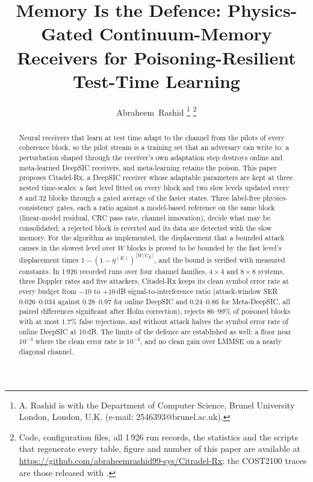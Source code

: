 \documentclass[journal]{IEEEtran}
\begin{document}
\title{Memory Is the Defence: Physics-Gated Continuum-Memory Receivers for Poisoning-Resilient Test-Time Learning}

\author{Abraheem~Rashid%
\thanks{A. Rashid is with the Department of Computer Science, Brunel University London, London, U.K. (e-mail: 2546393@brunel.ac.uk).}%
\thanks{Code, configuration files, all 1\,926 run records, the statistics and the scripts that regenerate every table, figure and number of this paper are available at \url{https://github.com/abraheemrashid99-sys/Citradel-Rx}; the COST2100 traces are those released with \cite{raviv2023}.}}

\maketitle

\begin{abstract}
Neural receivers that learn at test time adapt to the channel from the pilots of every
coherence block, so the pilot stream is a training set that an adversary can write to: a
perturbation shaped through the receiver's own adaptation step destroys online and
meta-learned DeepSIC receivers, and meta-learning retains the poison. This paper proposes
Citadel-Rx, a DeepSIC receiver whose adaptable parameters are kept at three nested
time-scales: a fast level fitted on every block and two slow levels updated every 8 and
32 blocks through a gated average of the faster states. Three label-free
physics-consistency gates, each a ratio against a model-based reference on the same
block (linear-model residual, CRC pass rate, channel innovation), decide what may be
consolidated; a rejected block is reverted and its data are detected with the slow
memory. For the algorithm as implemented, the displacement that a bounded attack causes
in the slowest level over $W$ blocks is proved to be bounded by the fast level's
displacement times $1-(1-\eta^{(K)})^{\lceil W/C_K\rceil}$, and the bound is verified with
measured constants. In 1\,926 recorded runs over four channel families, $4\times4$ and
$8\times8$ systems, three Doppler rates and five attackers, Citadel-Rx keeps its clean
symbol error rate at every budget from $-10$ to $+10$\,dB signal-to-interference ratio
(attack-window SER $0.026$--$0.034$ against $0.28$--$0.97$ for online DeepSIC and
$0.24$--$0.86$ for Meta-DeepSIC, all paired differences significant after Holm
correction), rejects $86$--$99\%$ of poisoned blocks with at most $1.7\%$ false rejections,
and without attack halves the symbol error rate of online DeepSIC at 10\,dB. The limits
of the defence are established as well: a floor near $10^{-3}$ where the clean error rate
is $10^{-4}$, and no clean gain over LMMSE on a nearly diagonal channel.
\end{abstract}
\end{document}
